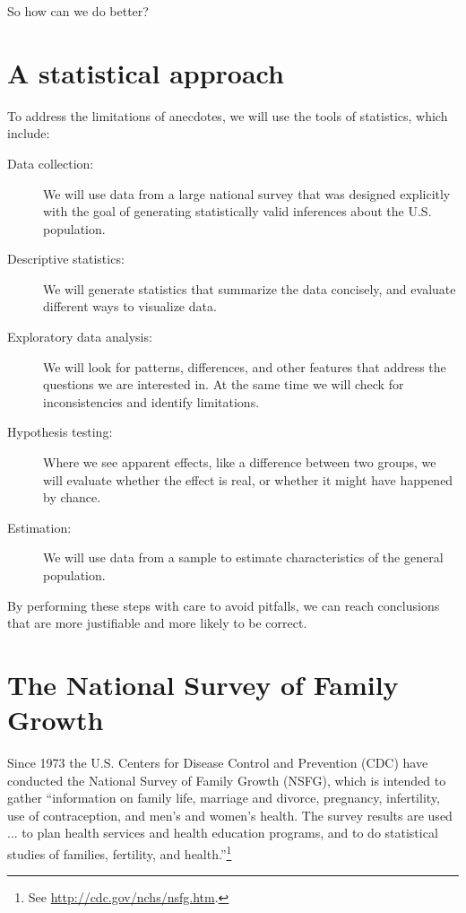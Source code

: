 \documentclass[12pt]{book}
\begin{document}
So how can we do better?

\section{A statistical approach}

To address the limitations of anecdotes, we will use the tools
of statistics, which include:

\begin{description}

\item[Data collection:] We will use data from a large national survey
  that was designed explicitly with the goal of generating
  statistically valid inferences about the U.S. population.

\item[Descriptive statistics:] We will generate statistics that
  summarize the data concisely, and evaluate different ways to
  visualize data.

\item[Exploratory data analysis:] We will look for
  patterns, differences, and other features that address the questions
  we are interested in.  At the same time we will check for
  inconsistencies and identify limitations.

\item[Hypothesis testing:] Where we see apparent effects, like a
  difference between two groups, we will evaluate whether the effect
  is real, or whether it might have happened by chance.

\item[Estimation:] We will use data from a sample to estimate
  characteristics of the general population.

\end{description}

By performing these steps with care to avoid pitfalls, we can
reach conclusions that are more justifiable and more likely to be
correct.


\section{The National Survey of Family Growth}
\label{nsfg}

Since 1973 the U.S. Centers for Disease Control and Prevention (CDC)
have conducted the National Survey of Family Growth (NSFG),
which is intended to gather ``information on family life, marriage and
divorce, pregnancy, infertility, use of contraception, and men's and
women's health. The survey results are used ... to plan health services and
health education programs, and to do statistical studies of families,
fertility, and health.''\footnote{See
  \url{http://cdc.gov/nchs/nsfg.htm}.}
\end{document}
